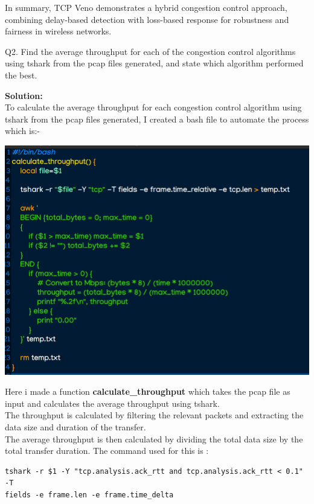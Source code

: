 \documentclass[11pt,a4paper]{article}
\begin{document}
In summary, TCP Veno demonstrates a hybrid congestion control approach, combining delay-based detection with loss-based response for robustness and fairness in wireless networks.

\begin{tcolorbox}[colback=boxbg, colframe=boxborder, title=Question-2]
    Q2. Find the average throughput for each of the congestion control algorithms using tshark
    from the pcap files generated, and state which algorithm performed the best.
\end{tcolorbox}

\Large{\textbf{Solution:}}\\
To calculate the average throughput for each congestion control algorithm using tshark from the pcap files generated, I created a bash file to automate the process which is:-
\begin{center}
    \includegraphics[width=1\columnwidth]{images/throughput_calculation1.jpg}
\end{center}
Here i made a function \textbf{calculate\_throughput} which takes the pcap file as input and calculates the average throughput using tshark.\\
The throughput is calculated by filtering the relevant packets and extracting the data size and duration of the transfer.\\
The average throughput is then calculated by dividing the total data size by the total transfer duration.
The command used for this is : 

\begin{tcolorbox}[colback=boxbg, colframe=boxborder, title=Command Used]
   \begin{verbatim}
tshark -r $1 -Y "tcp.analysis.ack_rtt and tcp.analysis.ack_rtt < 0.1" -T 
fields -e frame.len -e frame.time_delta 
\end{verbatim}
\end{tcolorbox}
\end{document}
